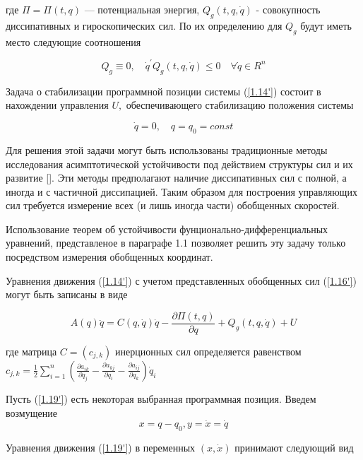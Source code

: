  где $\Pi = \Pi(t, q)$ --- потенциальная энергия, $Q_g(t, q, \dot q)$ - совокупность диссипативных и гироскопических сил. По их определению для $Q_g$ будут иметь место следующие соотношения
 
 \begin{equation} \label{1.17'}
   Q_g \equiv 0, \quad \dot q^{'} Q_g (t, q, \dot q) \le 0 \quad \forall \dot q \in R^n
 \end{equation}
 
Задача о стабилизации программной позиции системы (\ref{1.14'}) состоит в нахождении управления $U,$ обеспечивающего стабилизацию положения системы 

\begin{equation} \label{1.18'}
\dot q = 0, \quad q = q_0 = const
\end{equation}

Для решения этой задачи могут быть использованы традиционные методы исследования асимптотической устойчивости под действием структуры сил и их развитие []. Эти методы предполагают наличие диссипативных сил с полной, а иногда и с частичной диссипацией. Таким образом для построения управляющих сил требуется измерение всех (и лишь иногда части) обобщенных скоростей. 

Использование теорем об устойчивости фунционально-дифференциальных уравнений, представленое в параграфе 1.1 позволяет решить эту задачу только посредством измерения обобщенных координат.

Уравнения движения (\ref{1.14'}) с учетом представленных обобщенных сил (\ref{1.16'}) могут быть записаны в виде 

 \begin{equation} \label{1.19'}
 A(q) \ddot q = C(q, \dot q) \dot q - \frac{\partial \Pi(t, q)}{\partial q} + Q_g(t, q, \dot q) + U
 \end{equation}

 где матрица $C = (c_{j,k})$ инерционных сил определяется равенством $c_{j,k} = \frac12 \sum\limits_{i =1}^{n} (\frac{\partial a_{ik} } {\partial q_j} - \frac{\partial a_{kj}}{\partial q_i} - \frac{\partial a_{ij}}{\partial q_k}) \dot q_i$

Пусть (\ref{1.19'}) есть некоторая выбранная программная позиция. Введем возмущение
\begin{equation} \label{1.20'}
x = q - q_0, y = \dot x = \dot q
\end{equation}
 
Уравнения движения (\ref{1.19'}) в переменных $(x, \dot x)$ принимают следующий вид 

